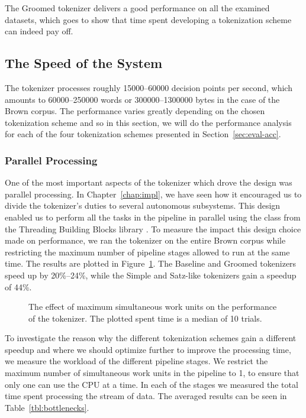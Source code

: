 The Groomed tokenizer delivers a good performance on all the examined datasets,
which goes to show that time spent developing a tokenization scheme can indeed
pay off.

\subsection{The Speed of the System}
\label{sec:eval-spd}

The tokenizer processes roughly 15000--60000 decision points per second, which
amounts to 60000--250000 words or 300000--1300000 bytes in the case of the
Brown corpus. The performance varies greatly depending on the chosen
tokenization scheme and so in this section, we will do the performance analysis
for each of the four tokenization schemes presented in
Section~\ref{sec:eval-acc}.

\subsubsection{Parallel Processing}
\label{ssec:eval-spd-parallel}

One of the most important aspects of the tokenizer which drove the design was
parallel processing. In Chapter~\ref{chap:impl}, we have seen how it encouraged
us to divide the tokenizer's duties to several autonomous subsystems. This
design enabled us to perform all the tasks in the pipeline in parallel using
the  class from the Threading Building Blocks library
\cite{web-tbb}. To measure the impact this design choice made on performance,
we ran the tokenizer on the entire Brown corpus while restricting the maximum
number of pipeline stages allowed to run at the same time. The results are
plotted in Figure~\ref{fig:plot-work-units}. The Baseline and Groomed
tokenizers speed up by 20\%--24\%, while the Simple and Satz-like tokenizers
gain a speedup of 44\%.

\begin{figure}
  \begin{center}
    
    \caption{The effect of maximum simultaneous work units on the performance of
             the tokenizer. The plotted spent time is a median of 10 trials.}
    \label{fig:plot-work-units}
  \end{center}
\end{figure}

To investigate the reason why the different tokenization schemes gain a
different speedup and where we should optimize further to improve the
processing time, we measure the workload of the different pipeline stages. We
restrict the maximum number of simultaneous work units in the pipeline to 1, to
ensure that only one can use the CPU at a time. In each of the stages we
measured the total time spent processing the stream of data. The averaged
results can be seen in Table~\ref{tbl:bottlenecks}.

